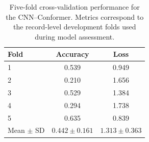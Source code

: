 \begin{table}[H]
  \centering
  \caption{Five-fold cross-validation performance for the CNN--Conformer. Metrics correspond to the record-level development folds used during model assessment.}
  \label{tab:cv-main-model}
  \begin{tabular}{lcc}
    \toprule
    Fold & Accuracy & Loss \\
    \midrule
    1 & 0.539 & 0.949 \\
    2 & 0.210 & 1.656 \\
    3 & 0.529 & 1.384 \\
    4 & 0.294 & 1.738 \\
    5 & 0.635 & 0.839 \\
    \midrule
    Mean $\pm$ SD & $0.442 \pm 0.161$ & $1.313 \pm 0.363$ \\
    \bottomrule
  \end{tabular}
\end{table}
